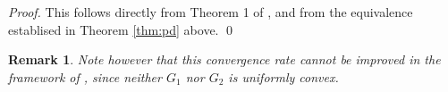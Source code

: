 \documentclass{article} %
\newtheorem{remark}{Remark}
\begin{document}
\begin{proof}
This follows directly from Theorem 1 of \cite{chambolle2010}, and from the equivalence establised in Theorem \ref{thm:pd} above.
\qed
\end{proof}

\begin{remark}
Note however that this convergence rate cannot be improved in the framework of \cite{chambolle2010}, since neither $G_1$ nor $G_2$ is \textit{uniformly convex}.
\end{remark}


\end{document}

